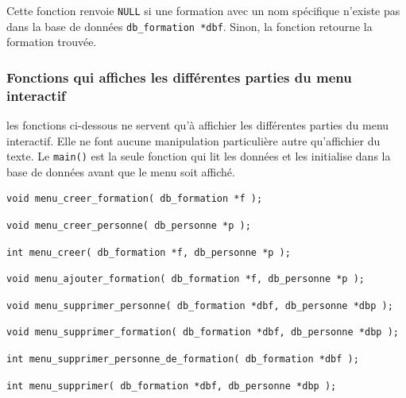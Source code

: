 \documentclass[11pt]{article}
\begin{document}
Cette fonction renvoie \texttt{NULL} si une formation avec un nom spécifique n'existe pas dans la base de données \texttt{db\_formation *dbf}. Sinon, la fonction retourne la formation trouvée.

\subsubsection{Fonctions qui affiches les différentes parties du menu interactif}
les fonctions ci-dessous ne servent qu'à affichier les différentes parties du menu interactif. Elle ne font aucune manipulation particulière autre qu'affichier du texte. Le \texttt{main()} est la seule fonction qui lit les données et les initialise dans la base de données avant que le menu soit affiché.

\begin{lstlisting}[firstnumber=618]
  void menu_creer_formation( db_formation *f );
\end{lstlisting}

\begin{lstlisting}[firstnumber=793]
  void menu_creer_personne( db_personne *p );
\end{lstlisting}

\begin{lstlisting}[firstnumber=953]
  int menu_creer( db_formation *f, db_personne *p );
\end{lstlisting}

\begin{lstlisting}[firstnumber=990]
  void menu_ajouter_formation( db_formation *f, db_personne *p );
\end{lstlisting}

\begin{lstlisting}[firstnumber=1103]
  void menu_supprimer_personne( db_formation *dbf, db_personne *dbp );
\end{lstlisting}

\begin{lstlisting}[firstnumber=1182]
  void menu_supprimer_formation( db_formation *dbf, db_personne *dbp );
\end{lstlisting}

\begin{lstlisting}[firstnumber=1271]
  int menu_supprimer_personne_de_formation( db_formation *dbf );
\end{lstlisting}

\begin{lstlisting}[firstnumber=1396]
  int menu_supprimer( db_formation *dbf, db_personne *dbp );
\end{lstlisting}
\end{document}
